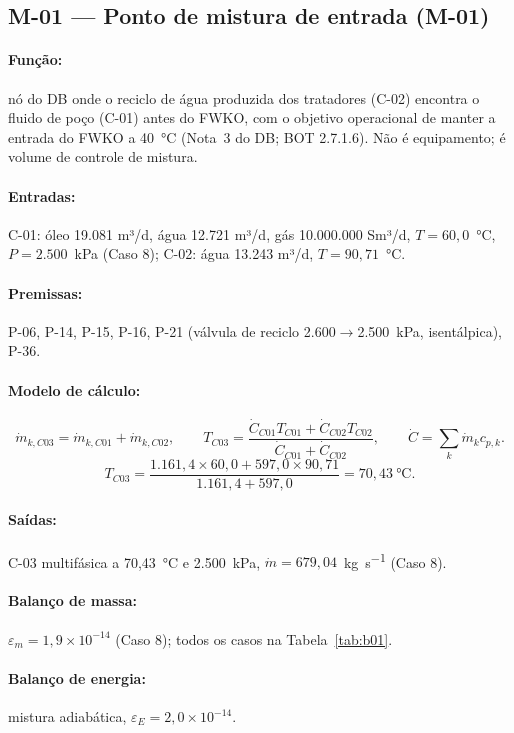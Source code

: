 \documentclass[11pt,a4paper]{article}
\numberwithin{equation}{section}
\numberwithin{table}{section}
\numberwithin{figure}{section}
\begin{document}
\subsection{M-01 --- Ponto de mistura de entrada (M-01)}
\paragraph{Função:} nó do DB onde o reciclo de água produzida dos tratadores (C-02) encontra o fluido de poço (C-01) antes do FWKO, com o objetivo operacional de manter a entrada do FWKO a 40~\si{\celsius} (Nota~3 do DB; BOT 2.7.1.6). Não é equipamento; é volume de controle de mistura.
\paragraph{Entradas:} C-01: óleo 19.081 m³/d, água 12.721 m³/d, gás 10.000.000 Sm³/d, $T=60,0$~\si{\celsius}, $P=2.500$~\si{\kilo\pascal} (Caso 8); C-02: água 13.243 m³/d, $T=90,71$~\si{\celsius}.
\paragraph{Premissas:} P-06, P-14, P-15, P-16, P-21 (válvula de reciclo 2.600$\to$2.500~\si{\kilo\pascal}, isentálpica), P-36.
\paragraph{Modelo de cálculo:} 
\begin{equation}
\dot m_{k,C03}=\dot m_{k,C01}+\dot m_{k,C02},\qquad T_{C03}=\frac{\dot C_{C01}T_{C01}+\dot C_{C02}T_{C02}}{\dot C_{C01}+\dot C_{C02}},\qquad \dot C=\sum_k\dot m_k c_{p,k}.
\end{equation}
\begin{equation}
T_{C03}=\frac{1.161{,}4\times60{,}0+597{,}0\times90{,}71}{1.161{,}4+597{,}0}=70{,}43\ \si{\celsius}.
\end{equation}
\paragraph{Saídas:} C-03 multifásica a 70,43~\si{\celsius} e 2.500~\si{\kilo\pascal}, $\dot m=679,04$~\si{\kilogram\per\second} (Caso 8).
\paragraph{Balanço de massa:} $\varepsilon_m=$$1{,}9\times10^{-14}$ (Caso 8); todos os casos na Tabela~\ref{tab:b01}.
\paragraph{Balanço de energia:} mistura adiabática, $\varepsilon_E=$$2{,}0\times10^{-14}$.
\end{document}
